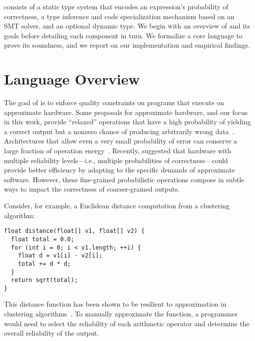 \lang consists of a static type system that encodes an expression's
probability of correctness, a type inference and code specialization mechanism
based on an SMT solver, and an optional dynamic type.
We begin with an overview of \lang and its goals before detailing each
component in turn.
We formalize a core language to prove its soundness,
and we report on our implementation and empirical findings.


\section{Language Overview}
\label{decaf:sec:overview}

The goal of \lang is to enforce quality constraints on programs that execute
on approximate hardware.
Some proposals for approximate hardware, and our focus in this work, provide ``relaxed'' operations that
have a high probability of yielding a correct output but a nonzero chance of
producing arbitrarily wrong data~\cite{truffle}.
Architectures that allow even a very small probability of error can conserve a
large fraction of operation energy~\cite{kim-hpca, uva-adder}.
Recently, \citet{quora} suggested that hardware with multiple
reliability levels---i.e., multiple probabilities of correctness---could provide
better efficiency by adapting to the specific demands of approximate software.
However, these fine-grained probabilistic operations compose in subtle ways to
impact the correctness of coarser-grained outputs.

Consider, for example, a Euclidean distance computation from a clustering
algorithm:
%
\begin{lstlisting}
float distance(float[] v1, float[] v2) {
  float total = 0.0;
  for (int i = 0; i < v1.length; ++i) {
    float d = v1[i] - v2[i];
    total += d * d;
  }
  return sqrt(total);
}
\end{lstlisting}
%
This distance function has been shown to be resilient to approximation in
clustering algorithms~\cite{npu}.
To manually approximate the function, a programmer would need to select the
reliability of each arithmetic operator and determine the overall reliability
of the output.

